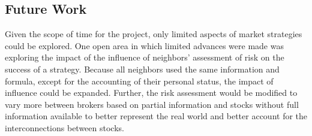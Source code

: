 \documentclass[letterpaper, 10 pt, proceedings]{ieeetran}
\begin{document}
	\subsection{Future Work}\label{subsec:futurework}
	Given the scope of time for the project, only limited aspects of market strategies could be explored. One open area in which limited advances were made was exploring the impact of the influence of neighbors' assessment of risk on the success of a strategy. Because all neighbors used the same information and formula, except for the accounting of their personal status, the impact of influence could be expanded. Further, the risk assessment would be modified to vary more between brokers based on partial information and stocks without full information available to better represent the real world and better account for the interconnections between stocks. 
\end{document}
